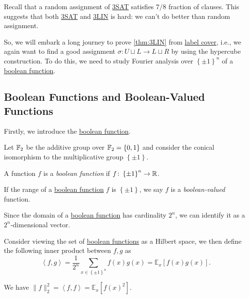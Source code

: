 \begin{note}
	Recall that a random assignment of \hyperref[prb:max-3SAT]{3SAT} satisfies \(7 / 8\) fraction of clauses. This suggests that both \hyperref[prb:max-3SAT]{3SAT} and \hyperref[prb:max-3LIN]{3LIN} is hard: we can't do better than random assignment.
\end{note}

So, we will embark a long journey to prove \autoref{thm:3LIN} from \hyperref[prb:label-cover]{label cover}, i.e., we again want to find a good assignment \(\sigma \colon U \sqcup L \to L \sqcup R\) by using the hypercube construction. To do this, we need to study Fourier analysis over \(\left\{ \pm 1 \right\} ^n\) of a \hyperref[def:boolean-function]{boolean function}.

\subsection{Boolean Functions and Boolean-Valued Functions}
Firstly, we introduce the \hyperref[def:boolean-function]{boolean function}.

\begin{definition*}
	Let \(\mathbb{\MakeUppercase{f}} _2\) be the additive group over \(\mathbb{\MakeUppercase{f}} _2 = \left\{ 0, 1 \right\} \) and consider the conical isomorphism to the multiplicative group \(\left\{ \pm 1 \right\} \).
	\begin{definition}\label{def:boolean-function}
		A function \(f\) is a \emph{boolean function} if \(f\colon \left\{ \pm 1 \right\} ^n \to \mathbb{\MakeUppercase{r}} \).
	\end{definition}

	\begin{definition}\label{def:boolean-valued}
		If the range of a \hyperref[def:boolean-function]{boolean function} \(f\) is \(\left\{ \pm 1 \right\} \), we say \(f\) is a \emph{boolean-valued} function.
	\end{definition}
\end{definition*}

\begin{note}
	Since the domain of a \hyperref[def:boolean-function]{boolean function} has cardinality \(2^n\), we can identify it as a \(2^n\)-dimensional vector.
\end{note}

Consider viewing the set of \hyperref[def:boolean-function]{boolean functions} as a Hilbert space, we then define the following inner product between \(f, g\) as
\[
	\left\langle f, g \right\rangle
	= \frac{1}{2^n} \sum_{x\in \left\{ \pm 1 \right\} ^n} f(x) g(x)
	= \mathbb{E}_{x}\left[f(x) g(x) \right] .
\]
\begin{note}
	We have \(\lVert f \rVert _2 ^2 = \left\langle f, f \right\rangle = \mathbb{E}_{x}\left[f(x)^2 \right] \).
\end{note}

